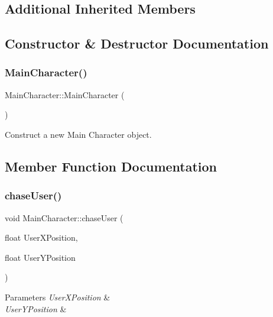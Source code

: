 \subsection*{Additional Inherited Members}


\subsection{Constructor \& Destructor Documentation}
\mbox{\label{classMainCharacter_a822c6796f6cac04dedfaa12846f1dd42}} 
\subsubsection{\texorpdfstring{MainCharacter()}{MainCharacter()}}
{\footnotesize\ttfamily Main\+Character\+::\+Main\+Character (\begin{DoxyParamCaption}{ }\end{DoxyParamCaption})}



Construct a new Main Character object. 



\subsection{Member Function Documentation}
\mbox{\label{classMainCharacter_aeb9d4174780f4cdc1901e9d0597b6da8}} 
\subsubsection{\texorpdfstring{chaseUser()}{chaseUser()}}
{\footnotesize\ttfamily void Main\+Character\+::chase\+User (\begin{DoxyParamCaption}\item[{float}]{User\+X\+Position,  }\item[{float}]{User\+Y\+Position }\end{DoxyParamCaption})}


\begin{DoxyParams}{Parameters}
{\em User\+X\+Position} & \\
\hline
{\em User\+Y\+Position} & \\
\hline
\end{DoxyParams}
\mbox{\label{classMainCharacter_a88c571025d325e44d349a1e899e8b22a}} 

